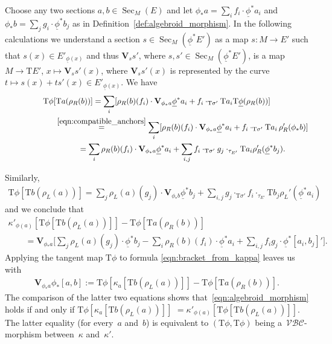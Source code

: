 \documentclass[10pt,a4paper]{amsart}
\newcommand{\und}{\underline}
\newcommand{\Sec}{\operatorname{Sec}}
\newcommand{\V}{\mathbf{V}} %
\newcommand{\ra}{\rightarrow}
\newcommand{\rhoL}{\rho_L} %
\newcommand{\rhoR}{\rho_R}
\newcommand{\T}{\mathrm{T}} %
\newcommand{\catZM}{{\mathcal{VBC}}} %
\numberwithin{equation}{section}
\theoremstyle{definition}
\begin{document}
Choose any two sections $a,b\in\Sec_M(E)$ and let $\phi_\ast a=\sum_i f_i\cdot \und{\phi}^\ast a_i$ and $\phi_\ast b=\sum_j g_i\cdot \und{\phi}^\ast b_j$ as in Definition~\ref{def:algebroid_morphism}. In the following calculations we understand a section $s\in\Sec_M(\und{\phi}^\ast E')$ as a map $s\colon M\ra E'$ such that $s(x)\in E'_{\und{\phi}(x)}$ and thus $\V_{s}{s'}$, where $s, s'\in \Sec_M(\und{\phi}^\ast E')$, is a map $M \ra \T E'$, $x\mapsto \V_s{s'}(x)$, where $\V_s{s'}(x)$ is represented by the curve $t\mapsto s(x)+ t s'(x) \in E'_{\und{\phi}(x)}$. We have
\begin{gather*}
\T\phi [\T a(\rhoR(b)) ]= \sum_i [\rhoR(b)(f_i)\cdot \V_{\phi_\ast a}\und{\phi}^\ast a_i+f_i\cdot_{\T \sigma'} \T a_i \T \und{\phi}(\rhoR(b)) ]\\
\hphantom{\T\phi [\T a(\rhoR(b)) ]}{} \overset{\eqref{eqn:compatible_anchors}}= \sum_i [\rhoR(b)(f_i)\cdot\V_{\phi_\ast a} \und{\phi}^\ast a_i+f_i \cdot_{\T\sigma'} \T a_i \, \rhoR'(\phi_\ast b) ]\\
\hphantom{\T\phi [\T a(\rhoR(b)) ]}{}=\sum_i\rhoR(b)(f_i)\cdot \V_{\phi_\ast a} \und{\phi}^\ast a_i +\sum_{i,j}f_i\cdot_{\T\sigma'}g_j\cdot_{\tau_{E'}} \T a_i \rhoR'(\und{\phi}^\ast b_j).
\end{gather*}

Similarly,
\begin{gather*}\T\phi [\T b(\rhoL(a)) ]=
\sum_j\rhoL(a)(g_j)\cdot \V_{\phi_\ast b}\und{\phi}^\ast b_j+\sum_{i,j}g_j\cdot_{\T\sigma'} f_i \cdot_{\tau_{E'}}\T b_j \rhoL'(\und{\phi}^\ast a_i)\end{gather*}
and we conclude that
\begin{gather*}
\kappa'_{\phi(a)} [\T\phi [\T b(\rhoL(a)) ] ]-\T\phi [\T a(\rhoR(b)) ] \\
\qquad{}= \V_{\phi_\ast a}\bigg[\sum_j\rhoL(a)(g_j)\cdot \und{\phi}^\ast b_j-\sum_i\rhoR(b)(f_i)\cdot
 \und{\phi}^\ast a_i +\sum_{i,j}f_ig_j\cdot\und{\phi}^\ast[a_i,b_j]'\bigg].
\end{gather*}
Applying the tangent map $\T\phi$ to formula \eqref{eqn:bracket_from_kappa} leaves us with
\begin{gather*}\V_{ \phi_\ast a}\phi_\ast[a,b]:=\T\phi [\kappa_a [\T b(\rhoL(a)) ] ]-\T\phi [\T a(\rhoR(b)) ].\end{gather*}
The comparison of the latter two equations shows that~\eqref{eqn:algebroid_morphism} holds if and only if $\T\phi [\kappa_a\! [\T b(\rhoL(a)) ] ]\!\!$ $=\kappa'_{\phi(a)} [\T\phi [\T b(\rhoL(a)) ] ]$. The latter equality (for every~$a$ and~$b$) is equivalent to $(\T\phi,\T\phi)$ being a~$\catZM$-morphism between~$\kappa$ and~$\kappa'$. %
\end{document}
